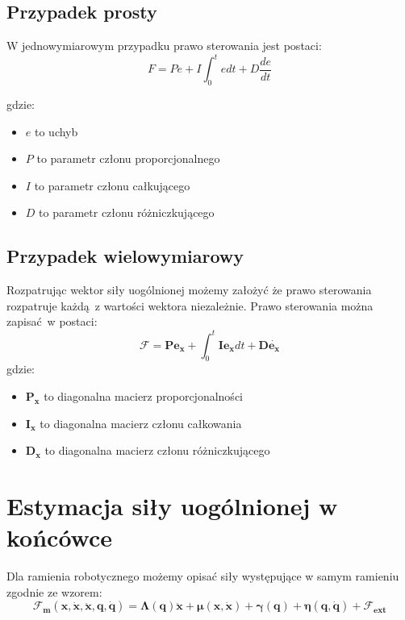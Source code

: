 \subsection{Przypadek prosty}
W jednowymiarowym przypadku prawo sterowania jest postaci:
\begin{equation}
F = Pe + I\int_{0}^{t}e dt + D\frac{de}{dt}
\end{equation}

gdzie:
\begin{itemize}
	\item $e$ to uchyb
	\item $P$ to parametr członu proporcjonalnego
	\item $I$ to parametr członu całkującego
	\item $D$ to parametr członu różniczkującego
\end{itemize}

\subsection{Przypadek wielowymiarowy}
Rozpatrując wektor siły uogólnionej możemy założyć że prawo sterowania rozpatruje każdą z wartości wektora niezależnie. Prawo sterowania można zapisać w postaci:
\begin{equation}
\boldsymbol{\mathcal{F}} = \boldsymbol{P}\boldsymbol{e_x} +\int_{0}^{t}  \boldsymbol{I}\boldsymbol{e_x}dt + \boldsymbol{D}\dot{\boldsymbol{e_x}}
\end{equation}
gdzie:
\begin{itemize}
	\item $\boldsymbol{P_x}$ to diagonalna macierz proporcjonalności
	\item $\boldsymbol{I_x}$ to diagonalna macierz członu całkowania
	\item $\boldsymbol{D_x}$ to diagonalna macierz członu różniczkującego
\end{itemize}

\section{Estymacja siły uogólnionej w końcówce}
Dla ramienia robotycznego możemy opisać siły występujące w samym ramieniu zgodnie ze wzorem:
\begin{equation}
\boldsymbol{\mathcal{F}_m}(\boldsymbol{x}, \dot{\boldsymbol{x}}, \ddot{\boldsymbol{x}}, \boldsymbol{q}, \dot{\boldsymbol{q}}) = \boldsymbol{\Lambda}(\boldsymbol{q})\boldsymbol{\ddot{x}} + \boldsymbol{\mu}(\boldsymbol{x}, \boldsymbol{\dot{x}}) + \boldsymbol{\gamma}(\boldsymbol{q}) + \boldsymbol{\eta}(\boldsymbol{q}, \boldsymbol{\dot{q}}) + \boldsymbol{\mathcal{F}_{ext}}
\label{eq:ramie}
\end{equation}

